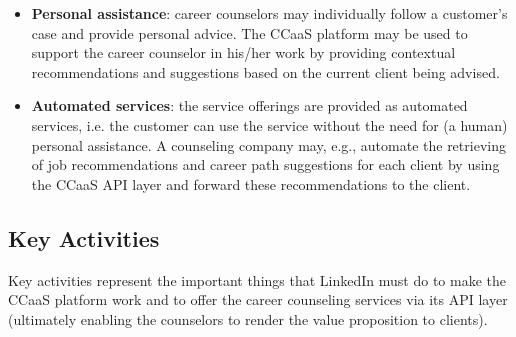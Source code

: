 \begin{itemize}
    \item \textbf{Personal assistance}: career counselors may individually follow a customer's case and 
            provide personal advice. The CCaaS platform may be used to support the career counselor
            in his/her work by providing contextual recommendations and suggestions based on the 
            current client being advised.
    \item \textbf{Automated services}: the service offerings are provided as automated services, i.e. 
            the customer can use the service without the need for (a human) personal assistance.
            A counseling company may, e.g., automate the retrieving of job recommendations and 
            career path suggestions for each client by using the CCaaS API layer and forward
            these recommendations to the client. 
\end{itemize}

\subsection{Key Activities}

Key activities represent the important things that LinkedIn must do to make the CCaaS platform work
and to offer the career counseling services via its API layer (ultimately enabling the counselors
to render the value proposition to clients).

